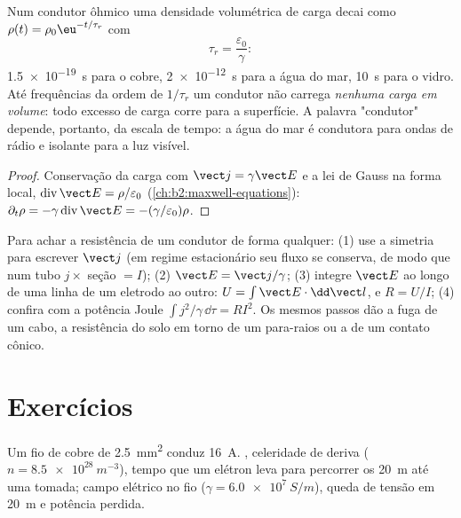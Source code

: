 \begin{proposition}\label{prop:b2:charges-currents-conduction:relaxation}
Num condutor ôhmico uma densidade volumétrica de carga decai como $\rho(t) =
\rho_0\eu^{-t/\tau_r}$ com
\[
\tau_r = \frac{\varepsilon_0}{\gamma} :
\]
\qty{1.5e-19}{s} para o cobre, \qty{2e-12}{s} para a água do mar, \qty{10}{s} para o vidro.
Até frequências da ordem de $1/\tau_r$ um condutor não carrega \emph{nenhuma
carga em volume}: todo excesso de carga corre para a superfície. A palavra
"condutor" depende, portanto, da escala de tempo: a água do mar é condutora
para ondas de rádio e isolante para a luz visível.
\end{proposition}

\begin{proof}
Conservação da carga com $\vect j = \gamma\vect E$ e a lei de Gauss na forma
local, $\operatorname{div}\vect E = \rho/\varepsilon_0$ (\cref{ch:b2:maxwell-equations}):
$\partial_t\rho = -\gamma\operatorname{div}\vect E = -(\gamma/\varepsilon_0)\rho$.
\end{proof}

\begin{method}\label{met:b2:charges-currents-conduction:method}
Para achar a resistência de um condutor de forma qualquer: (1) use a
simetria para escrever $\vect j$ (em regime estacionário seu fluxo se conserva, de modo que num
tubo $j \times$ seção $= I$); (2) $\vect E = \vect j/\gamma$; (3) integre
$\vect E$ ao longo de uma linha de um eletrodo ao outro: $U = \int\vect E\cdot
\dd\vect l$, e $R = U/I$; (4) confira com a potência Joule $\int j^2/\gamma\,
\dd\tau = RI^2$. Os mesmos passos dão a fuga de um cabo, a resistência
do solo em torno de um para-raios ou a de um contato cônico.
\end{method}

\section{Exercícios}

\begin{exercise}[$\star$]\label{exo:b2:charges-currents-conduction:1}
Um fio de cobre de \qty{2.5}{mm^2} conduz \qty{16}{A}. , celeridade
de deriva ($n = \qty{8.5e28}{m^{-3}}$), tempo que um elétron leva para percorrer os
\qty{20}{m} até uma tomada; campo elétrico no fio ($\gamma = \qty{6.0e7}{S/m}$),
queda de tensão em \qty{20}{m} e potência perdida.
\end{exercise}

